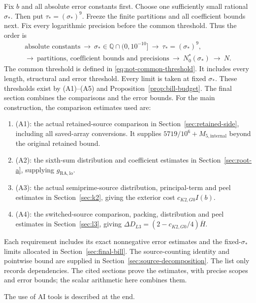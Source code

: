 Fix $b$ and all absolute error constants first.
Choose one sufficiently small rational $\sigma_*$.
Then put $\tau_*=(\sigma_*)^9$.
Freeze the finite partitions and all coefficient bounds next.
Fix every logarithmic precision before the common threshold.
Thus the order is
\begin{equation}\label{eq:intro-order}
\begin{gathered}
 \text{absolute constants}\ \longrightarrow\
 \sigma_*\in\mathbb Q\cap(0,10^{-10}]\ \longrightarrow\
 \tau_*=(\sigma_*)^9,\\
 \longrightarrow\ \text{partitions, coefficient bounds and precisions}
 \ \longrightarrow\ N_0^*(\sigma_*)\ \longrightarrow\ N.
\end{gathered}
\end{equation}
The common threshold is defined in \eqref{eq:not-common-threshold}.
It includes every length, structural and error threshold.
Every limit is taken at fixed $\sigma_*$.
These thresholds exist by \textup{(A1)}--\textup{(A5)} and
Proposition~\ref{prop:bill-budget}.
The final section combines the comparisons and the error bounds.
For the main construction, the comparison estimates used are:
\begin{enumerate}
\item \textup{(A1)}: the actual retained-source comparison
in Section~\ref{sec:retained-side}, including all saved-array conversions.
It supplies $5719/10^6+M_{5,\mathrm{internal}}$ beyond the original
retained bound.
\item \textup{(A2)}: the sixth-sum distribution and
coefficient estimates in Section~\ref{sec:root-a}, supplying
$g_{\mathrm{RA,lo}}$.
\item \textup{(A3)}: the actual semiprime-source distribution,
principal-term and peel estimates in Section~\ref{sec:k2}, giving the
exterior cost $c_{K2,G0}I(b)$.
\item \textup{(A4)}: the switched-source comparison,
packing, distribution and peel estimates in Section~\ref{sec:l3}, giving
$\Delta D_{L3}=(2-c_{K2,G0}/4)\overline H$.
\end{enumerate}
Each requirement includes its exact nonnegative error estimates and the
fixed-$\sigma_*$ limits allocated in Section~\ref{sec:final-bill}.
The source-counting identity and pointwise bound are supplied in
Section~\ref{sec:source-decomposition}. The list only records dependencies.
The cited sections prove the estimates, with precise scopes and
error bounds; the scalar arithmetic here combines them.

The use of AI tools is described at the end.
